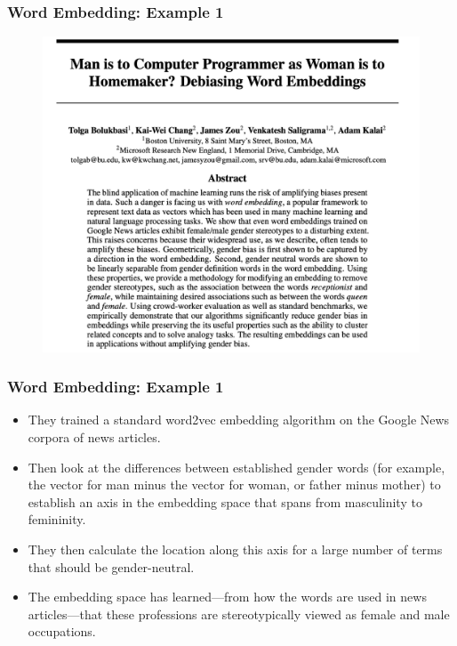 \documentclass[
  shownotes,
  xcolor={svgnames},
  hyperref={colorlinks,citecolor=DarkBlue,linkcolor=DarkRed,urlcolor=DarkBlue}
  , aspectratio=169]{beamer}
\begin{document}
\begin{frame}
\frametitle{Word Embedding: Example 1 }


  \begin{figure}[H] \centering
            \captionsetup{justification=centering}
              \includegraphics[scale=0.3]{figures/bolukbasi}
              
 \end{figure}

 \end{frame}
\begin{frame}
\frametitle{Word Embedding: Example 1 }

\begin{itemize}


\item They trained a standard word2vec embedding algorithm on the Google News corpora of news articles. 
\item Then look at the differences between established gender words (for example, the vector for man minus the vector for woman, or father minus mother) to establish an axis in the embedding space that spans from masculinity to femininity. 
\item They then calculate the location along this axis for a large number of terms that should be gender-neutral. 
\item  The embedding space has learned—from how the words are used in news articles—that these professions are stereotypically viewed as female and male occupations.
\end{itemize}

\end{frame}
\end{document}
